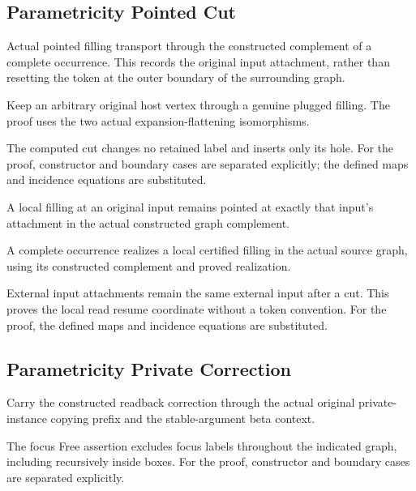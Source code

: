 \subsection{Parametricity Pointed Cut}
Actual pointed filling transport through the constructed complement of a complete occurrence. This records the original input attachment, rather than resetting the token at the outer boundary of the surrounding graph.

Keep an arbitrary original host vertex through a genuine plugged filling. The proof uses the two actual expansion-flattening isomorphisms.
\par{}

The computed cut changes no retained label and inserts only its hole.
For the proof, constructor and boundary cases are separated explicitly; the defined maps and incidence equations are substituted.
\par{}

A local filling at an original input remains pointed at exactly that input's attachment in the actual constructed graph complement.
\par{}

A complete occurrence realizes a local certified filling in the actual source graph, using its constructed complement and proved realization.
\par{}

External input attachments remain the same external input after a cut. This proves the local read resume coordinate without a token convention.
For the proof, the defined maps and incidence equations are substituted.
\par{}

\subsection{Parametricity Private Correction}
Carry the constructed readback correction through the actual original private-instance copying prefix and the stable-argument beta context.

The focus Free assertion excludes focus labels throughout the indicated graph, including recursively inside boxes.
For the proof, constructor and boundary cases are separated explicitly.
\par{}

